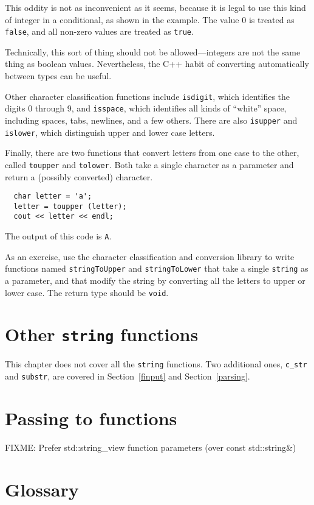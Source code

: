 This oddity is not as inconvenient as it seems, because it is
legal to use this kind of integer in a conditional, as shown
in the example.  The value 0 is treated as {\tt false}, and
all non-zero values are treated as {\tt true}.

Technically, this sort of thing should not be allowed---integers are
not the same thing as boolean values.  Nevertheless, the C++ habit of
converting automatically between types can be useful.

Other character classification functions include {\tt isdigit}, which
identifies the digits 0 through 9, and {\tt isspace}, which identifies
all kinds of ``white'' space, including spaces, tabs, newlines, and a
few others.  There are also {\tt isupper} and {\tt islower}, which
distinguish upper and lower case letters.

Finally, there are two functions that convert letters from one
case to the other, called {\tt toupper} and {\tt tolower}.  Both take
a single character as a parameter and return a (possibly
converted) character.

\begin{verbatim}
  char letter = 'a';
  letter = toupper (letter);
  cout << letter << endl;
\end{verbatim}
%
The output of this code is {\tt A}.

As an exercise, use the character classification and conversion
library to write functions named {\tt stringToUpper} and
{\tt stringToLower} that take a single {\tt string} as
a parameter, and that modify the string by converting all the
letters to upper or lower case.  The return type should be
{\tt void}.

\section{Other {\tt string} functions}

This chapter does not cover all the {\tt string} functions.
Two additional ones, {\tt c\_str} and {\tt substr}, are covered
in Section~\ref{finput} and Section~\ref{parsing}.

\section{Passing to functions}
FIXME: Prefer std::string\_view function parameters (over const std::string\&) 
\section{Glossary}

